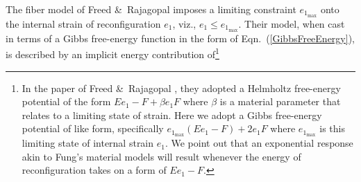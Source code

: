 The fiber model of Freed \&\ Rajagopal \cite{FreedRajagopal16} imposes a limiting constraint $e_{1_{\max}}$ onto the internal strain of reconfiguration $e_1$, viz., $e_1 \leq e_{1_{\max}}$.  Their model, when cast in terms of a Gibbs free-energy function in the form of Eqn.~(\ref{GibbsFreeEnergy}), is described by an implicit energy contribution of\footnote{
    In the paper of Freed \&\ Rajagopal \cite{FreedRajagopal16}, they adopted a Helmholtz free-energy potential of the form $E e_1 - F + \beta e_1 F$ where $\beta$ is a material parameter that relates to a limiting state of strain.  Here we adopt a Gibbs free-energy potential of like form, specifically $e_{1_{\max}} (E e_1 - F) + 2e_1 F$ where $e_{1_{\max}}$ is this limiting state of internal strain $e_1$.  We point out that an exponential response akin to Fung's material models will result whenever the energy of reconfiguration takes on a form of $E e_1 - F$.
}
